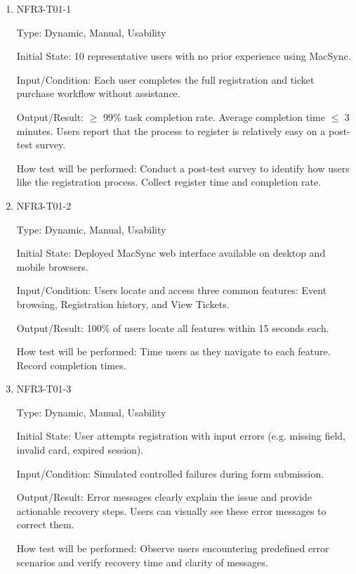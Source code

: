\documentclass[12pt, titlepage]{article}
\begin{document}
\begin{enumerate}
\item{NFR3-T01-1\\}

Type: Dynamic, Manual, Usability

Initial State: 10 representative users with no prior experience using MacSync.

Input/Condition: Each user completes the full registration and ticket purchase workflow without assistance.

Output/Result: $\geq$ 99\% task completion rate. Average completion time $\leq$ 3 minutes. Users report that the process to register is relatively easy on a post-test survey.

How test will be performed: Conduct a post-test survey to identify how users like the registration process. Collect register time and completion rate.

\item{NFR3-T01-2\\}

Type: Dynamic, Manual, Usability

Initial State: Deployed MacSync web interface available on desktop and mobile browsers.

Input/Condition: Users locate and access three common features: Event browsing, Registration history, and View Tickets.

Output/Result: 100\% of users locate all features within 15 seconds each.

How test will be performed: Time users as they navigate to each feature. Record completion times.


\item{NFR3-T01-3\\}

Type: Dynamic, Manual, Usability

Initial State: User attempts registration with input errors (e.g. missing field, invalid card, expired session).

Input/Condition: Simulated controlled failures during form submission.

Output/Result: Error messages clearly explain the issue and provide actionable recovery steps. Users can visually see these error messages to correct them.

How test will be performed: Observe users encountering predefined error scenarios and verify recovery time and clarity of messages.
\end{enumerate}
\end{document}
